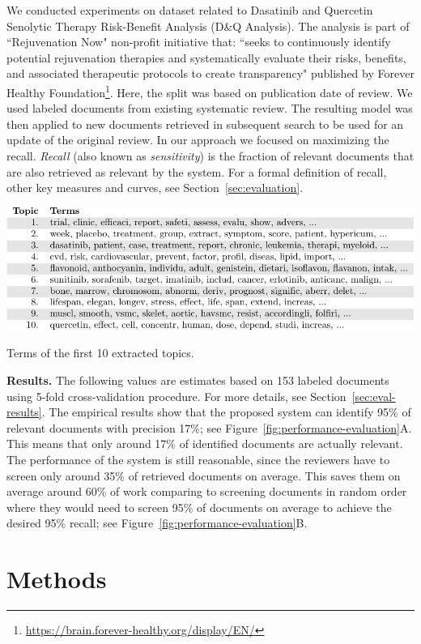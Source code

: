 \documentclass[10pt,twocolumn,letterpaper]{article}
\begin{document}
We conducted experiments on dataset related to Dasatinib and Quercetin Senolytic Therapy Risk-Benefit Analysis (D\&Q Analysis). The analysis is part of ``Rejuvenation Now" non-profit initiative that: ``seeks to continuously identify potential rejuvenation therapies and systematically evaluate their risks, benefits, and associated therapeutic protocols to create transparency" published by Forever Healthy Foundation\footnote{\url{https://brain.forever-healthy.org/display/EN/}}. 
Here, the split was based on publication date of review. We used labeled documents from existing systematic review. The resulting model was then applied to new documents retrieved in subsequent search to be used for an update of the original review. In our approach we focused on maximizing the recall. {\it Recall} (also known as {\it sensitivity}) is the fraction of relevant documents that are also retrieved as relevant by the system. For a formal definition of recall, other key measures and curves, see Section~\ref{sec:evaluation}.

\begin{table}[ht]
\centering
\includegraphics[width=.85\textwidth]{../tables/topics/topics-crop.pdf}
\caption{Terms of the first 10 extracted topics.}
\label{tab:topics}
\end{table}


{\bf Results.} The following values are estimates based on 153 labeled documents using 5-fold cross-validation procedure. For more details, see Section~\ref{sec:eval-results}. The empirical results show that the proposed system can identify 95\% of relevant documents with precision 17\%; see Figure~\ref{fig:performance-evaluation}A. This means that only around 17\% of identified documents are actually relevant. The performance of the system is still reasonable, since the reviewers have to screen only around 35\% of retrieved documents on average. This saves them on average around 60\% of work comparing to screening documents in random order where they would need to screen 95\% of documents on average to achieve the desired 95\% recall; see Figure~\ref{fig:performance-evaluation}B.

\section{Methods}
\end{document}
